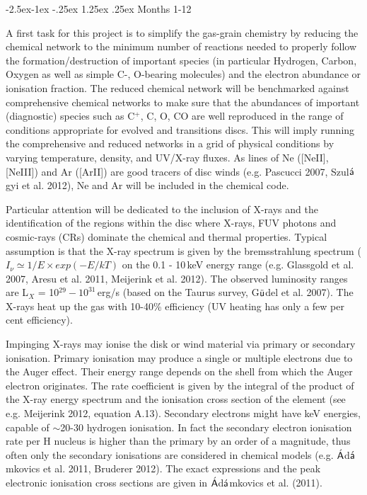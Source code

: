 \documentclass[10pt,fleqn,twoside]{article}
\makeatletter
\newcommand{\Tcol}{\color{blue}}
\renewcommand\paragraph{\@startsection{paragraph}{4}{\z@}%
            {-2.5ex\@plus -1ex \@minus -.25ex}%
            {1.25ex \@plus .25ex}%
            {\normalfont\normalsize\bfseries}}
\makeatother
\begin{document}
\paragraph{\Tcol Months 1-12}

\noindent {\Tcol\bf The reduced network.} A first task for this project is to simplify the gas-grain chemistry by reducing the chemical network to the minimum number of reactions needed to properly follow the formation/destruction of important species (in particular Hydrogen, Carbon, Oxygen as well as simple C-, O-bearing molecules) and the electron abundance or ionisation fraction. 
The reduced chemical network will be benchmarked against comprehensive chemical networks to make sure that the abundances of  important (diagnostic) species such as C$^+$, C, O, CO are well reproduced in the range of conditions appropriate for evolved and
transitions discs. This will imply running the comprehensive and reduced networks in a grid of physical conditions by varying temperature, density, and UV/X-ray fluxes.  As lines of Ne ([NeII], [NeIII]) and Ar ([ArII]) are good tracers of disc winds (e.g. Pascucci 2007, Szul$\acute{\textsf a}$gyi et al. 2012), Ne and Ar will be included in the chemical code. 

Particular attention will be dedicated to the inclusion of X-rays and the identification of the regions within the disc where X-rays, FUV photons and cosmic-rays (CRs) dominate the chemical and thermal properties. Typical assumption is that the X-ray spectrum is given by the bremsstrahlung spectrum ($I_{\nu} \simeq 1/E \times exp(-E/kT)$ on the 0.1 - 10\,keV energy range (e.g. Glassgold et al. 2007, Aresu et al. 2011, Meijerink et al. 2012). The observed luminosity ranges are L$_X$ = 10$^{29} - 10^{31}$\,erg/s (based on the Taurus survey, G$\ddot{\textsf u}$del et al. 2007). The X-rays heat up the gas with 10-40\% efficiency (UV heating has only a few per cent efficiency). 

Impinging X-rays may ionise the disk or wind material via primary or secondary ionisation. Primary ionisation may produce a single or multiple electrons due to the Auger effect. Their energy range depends on the shell from which  the Auger electron originates. The rate coefficient is given by the integral of the product of the X-ray energy spectrum and the ionisation cross section of the element (see e.g. Meijerink 2012, equation A.13). Secondary electrons might have keV energies, capable of $\sim$20-30 hydrogen ionisation. In fact the secondary electron ionisation rate per H nucleus is higher than the primary by an order of a magnitude, thus often only the secondary ionisations are considered in chemical models (e.g. $\acute{\textsf A}$d$\acute{\textsf a}$mkovics et al. 2011, Bruderer 2012).
The exact expressions and the peak electronic ionisation cross sections are given in $\acute{\textsf A}$d$\acute{\textsf a}$mkovics et al. (2011). 
\end{document}
